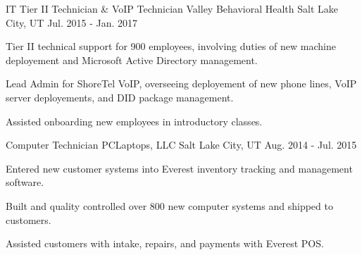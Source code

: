 \begin{cventries}
  \cventry
    {IT Tier II Technician \& VoIP Technician} %
    {Valley Behavioral Health} %
    {Salt Lake City, UT} %
    {Jul. 2015 - Jan. 2017} %
    {
      \begin{cvitems} %
        \item {Tier II technical support for 900 employees, involving duties of new machine deployement and Microsoft Active Directory management.}
        \item {Lead Admin for ShoreTel VoIP, overseeing deployement of new phone lines, VoIP server deployements, and DID package management.}
        \item {Assisted onboarding new employees in introductory classes.}
      \end{cvitems}
    }

  \cventry
    {Computer Technician} %
    {PCLaptops, LLC} %
    {Salt Lake City, UT} %
    {Aug. 2014 - Jul. 2015} %
    {
      \begin{cvitems} %
        \item {Entered new customer systems into Everest inventory tracking and management software.}
        \item {Built and quality controlled over 800 new computer systems and shipped to customers.}
        \item {Assisted customers with intake, repairs, and payments with Everest POS.}
      \end{cvitems}
      }


\end{cventries}

